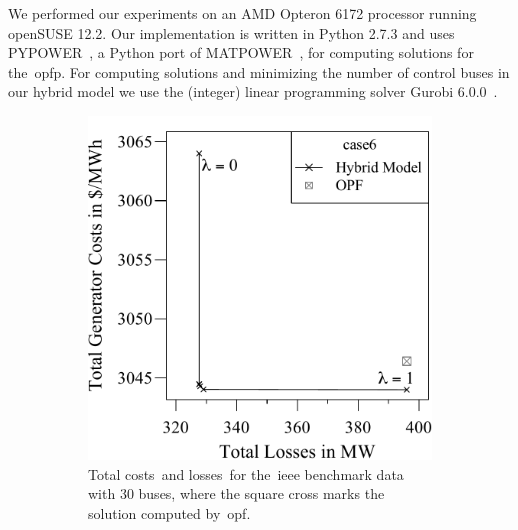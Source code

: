 We performed our experiments on an AMD Opteron 6172 processor running openSUSE
12.2. Our implementation is written in Python 2.7.3 and uses
PYPOWER~\parencite{online:pypower}, a Python port of
MATPOWER~\parencite{Zimmerman2009,Zimmerman2011a}, for computing solutions for
the~\gls{opfp}. For computing solutions and minimizing the number of control
buses in our hybrid model we use the (integer) linear programming solver Gurobi
6.0.0~\parencite{online:Gurobi}.
% 
\begin{figure}[t!]%
    \centering
    \begin{subfigure}[t]{.492\textwidth}
     \centering
         \includegraphics[width=\plotscale\linewidth, page=4,trim=0cm 0cm 0cm
         0cm]{factsplacement/plots/plotCostsVsLosses.pdf}
     \caption{Total costs~\gencost and losses~\losscost for the~\gls{ieee}
     benchmark data with 30 buses, where the square cross marks the solution
     computed by~\gls{opf}.}
     \label{ch:facts:sub:experiments-control-units:fig:plot-costs-losses}
    \end{subfigure}
    \hfill
    \begin{subfigure}[t]{.492\textwidth}
     \centering

\end{subfigure}
\end{figure}
